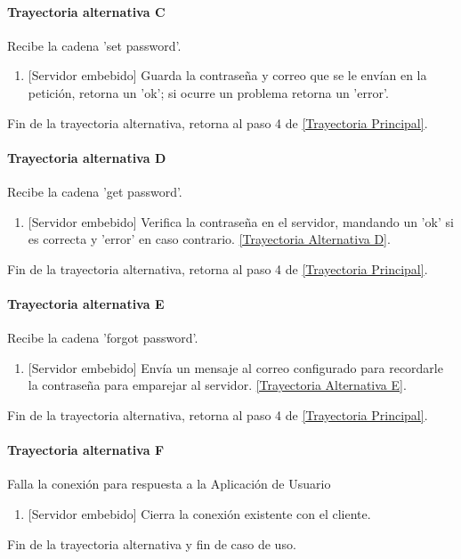 \paragraph{Trayectoria alternativa C} \label{SUB-M-CU1.4:TC}
	Recibe la cadena 'set password'.
	\begin{enumerate}[label=C\arabic*.]
		\item {[Servidor embebido]} Guarda la contraseña y correo que se le envían en la petición, retorna un 'ok'; si ocurre un problema retorna un 'error'.
	\end{enumerate}
	Fin de la trayectoria alternativa, retorna al paso 4 de  \hyperref[SUB-M-CU1.4:TP]{[Trayectoria Principal]}.
	
\paragraph{Trayectoria alternativa D} \label{SUB-M-CU1.4:TD}
	Recibe la cadena 'get password'.
	\begin{enumerate}[label=D\arabic*.]
		\item {[Servidor embebido]} Verifica la contraseña en el servidor, mandando un 'ok' si es correcta y 'error' en caso contrario.
		\hyperref[SUB-M-CU1.4:TD]{[Trayectoria Alternativa D]}.
	\end{enumerate}
	Fin de la trayectoria alternativa, retorna al paso 4 de  \hyperref[SUB-M-CU1.4:TP]{[Trayectoria Principal]}.
	
\paragraph{Trayectoria alternativa E} \label{SUB-M-CU1.4:TE}
	Recibe la cadena 'forgot password'.
	\begin{enumerate}[label=E\arabic*.]
		\item {[Servidor embebido]} Envía un mensaje al correo configurado para recordarle la contraseña para emparejar al servidor.
		\hyperref[SUB-M-CU1.4:TE]{[Trayectoria Alternativa E]}.
	\end{enumerate}
	Fin de la trayectoria alternativa, retorna al paso 4 de  \hyperref[SUB-M-CU1.4:TP]{[Trayectoria Principal]}.
	
\paragraph{Trayectoria alternativa F} \label{SUB-M-CU1.4:TF}
	Falla la conexión para respuesta a la Aplicación de Usuario
	\begin{enumerate}[label=F\arabic*.]
		\item {[Servidor embebido]} Cierra la conexión existente con el cliente.
	\end{enumerate}
	Fin de la trayectoria alternativa y fin de caso de uso.
